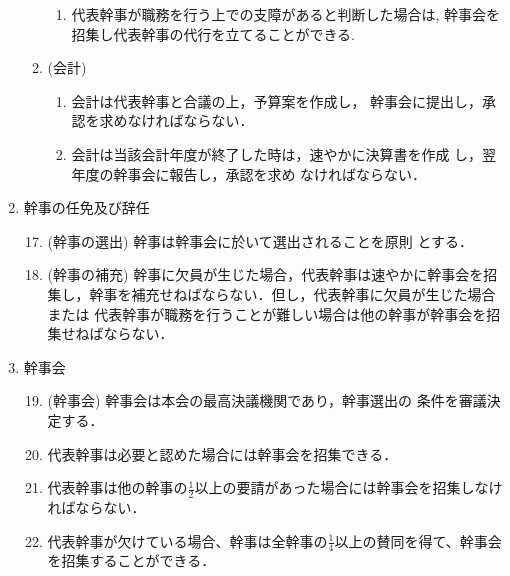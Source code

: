 \begin{enumerate}
\begin{enumerate}
\begin{enumerate}
	\item	代表幹事が職務を行う上での支障があると判断した場合は,
幹事会を招集し代表幹事の代行を立てることができる. \\
\end{enumerate}
%
\item	(会計)
\begin{enumerate}
	\item	会計は代表幹事と合議の上，予算案を作成し，
				幹事会に提出し，承認を求めなければならない．\\
	\item	会計は当該会計年度が終了した時は，速やかに決算書を作成
				し，翌年度の幹事会に報告し，承認を求め
なければならない．\\
\end{enumerate}
%
\end{enumerate}
%
\newpage
\item	幹事の任免及び辞任\\
%
\begin{enumerate}
\setcounter{enumii}{16}
\item	(幹事の選出) 幹事は幹事会に於いて選出されることを原則
				とする．\\
%
\item (幹事の補充) 幹事に欠員が生じた場合，代表幹事は速やかに幹事会を招
集し，幹事を補充せねばならない．但し，代表幹事に欠員が生じた場合または
代表幹事が職務を行うことが難しい場合は他の幹事が幹事会を招集せねばならない．\\
\end{enumerate}
%
\item    幹事会\\
%
\begin{enumerate}
\setcounter{enumii}{18}
\item    (幹事会) 幹事会は本会の最高決議機関であり，幹事選出の
                条件を審議決定する．\\
%
\item	代表幹事は必要と認めた場合には幹事会を招集できる．\\
\item	代表幹事は他の幹事の\(\displaystyle{\frac{1}{2}}\)以上の要請があった場合には幹事会を招集しなければならない．\\
\item	代表幹事が欠けている場合、幹事は全幹事の\(\displaystyle{\frac{1}{4}}\)以上の賛同を得て、幹事会を招集することができる．\\

\end{enumerate}
\end{enumerate}
